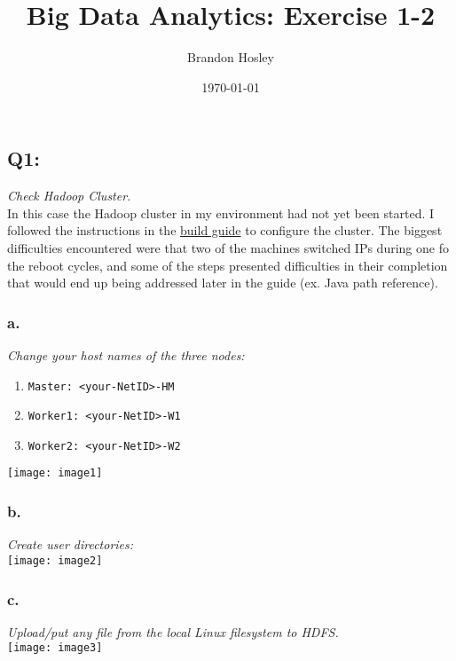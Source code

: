 \documentclass[]{article}
\title{Big Data Analytics: Exercise 1-2}
\author{Brandon Hosley}
\date{\today}
\begin{document}
\maketitle

\subsection*{Q1:}
\emph{Check Hadoop Cluster.} \\
In this case the Hadoop cluster in my environment had not yet been started.
I followed the instructions in the 
\href{https://uispringfield.instructure.com/courses/3620/files/261572/download?wrap=1}{build guide} 
to configure the cluster.
The biggest difficulties encountered were that two of the machines switched IPs during one fo the reboot cycles, and some of the steps presented difficulties in their completion that would end up being addressed later in the guide (ex. Java path reference). \vspace{-2em}

\subsubsection*{a.}
\emph{Change your host names of the three nodes:} \vspace{-1.5em} \\
\begin{enumerate}
	\itemsep-0.5em 
	\item \texttt{Master: <your-NetID>-HM}
	\item \texttt{Worker1: <your-NetID>-W1}
	\item \texttt{Worker2: <your-NetID>-W2}
\end{enumerate}
\texttt{[image: image1]} \vspace{-1.5em}

\subsubsection*{b.}
\emph{Create user directories:} \vspace{1em} \\
\texttt{[image: image2]} \vspace{-1em}

\subsubsection*{c.}
\emph{Upload/put any file from the local Linux filesystem to HDFS.} \vspace{1em} \\
\texttt{[image: image3]} \vspace{-1em}
\end{document}
